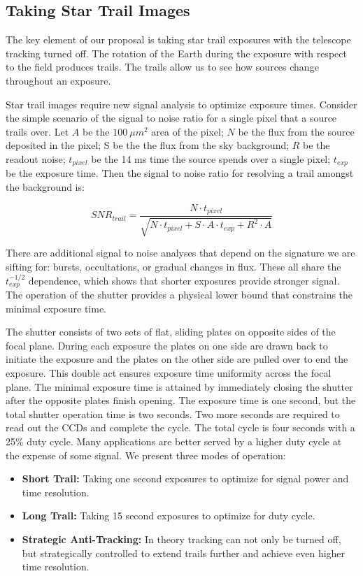 \documentclass[12pt, letterpaper]{article}
\begin{document}
\subsection{Taking Star Trail Images}
\label{sec:overview}

The key element of our proposal is taking star trail exposures with the telescope tracking turned off. The rotation of the Earth during the exposure with respect to the field produces trails. The trails allow us to see how sources change throughout an exposure. 

Star trail images require new signal analysis to optimize exposure times. Consider the simple scenario of the signal to noise ratio for a single pixel that a source trails over. Let $A$ be the $100\ \mu m^2$ area of the pixel; $N$ be the flux from the source deposited in the pixel; S be the the flux from the sky background; $R$ be the readout noise; $t_{pixel}$ be the 14 ms time the source spends over a single pixel; $t_{exp}$ be the exposure time. Then the signal to noise ratio for resolving a trail amongst the background is:

$$SNR_{trail} = \frac{N\cdot t_{pixel}}{\sqrt{N\cdot t_{pixel} + S \cdot A \cdot t_{exp} + R^2\cdot A}}$$

\noindent There are additional signal to noise analyses that depend on the signature we are sifting for: bursts, occultations, or gradual changes in flux. These all share the $t_{exp}^{-1/2}$ dependence, which shows that shorter exposures provide stronger signal. The operation of the shutter provides a physical lower bound that constrains the minimal exposure time.

The shutter consists of two sets of flat, sliding plates on opposite sides of the focal plane. During each exposure the plates on one side are drawn back to initiate the exposure and the plates on the other side are pulled over to end the exposure. This double act ensures exposure time uniformity across the focal plane. The minimal exposure time is attained by immediately closing the shutter after the opposite plates finish opening. The exposure time is one second, but the total shutter operation time is two seconds. Two more seconds are required to read out the CCDs and complete the cycle. The total cycle is four seconds with a 25\% duty cycle. Many applications are better served by a higher duty cycle at the expense of some signal. We present three modes of operation:

\begin{itemize}
\item \textbf{Short Trail:} Taking one second exposures to optimize for signal power and time resolution. 

\item \textbf{Long Trail:} Taking 15 second exposures to optimize for duty cycle.

\item \textbf{Strategic Anti-Tracking:} In theory tracking can not only be turned off, but strategically controlled to extend trails further and achieve even higher time resolution. 
\end{itemize}
\end{document}
